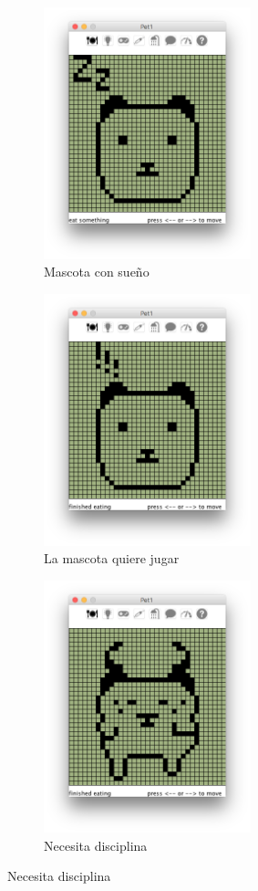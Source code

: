 \documentclass[12pt]{amsart}
\begin{document}
\begin{figure}
	\begin{subfigure}[b]{5cm}
	\centering
	\includegraphics[width=6cm]{images/Sleepy.jpg}
	\caption{Mascota con sue\~no}
	\label{sleepy}
	\end{subfigure}
	\begin{subfigure}[b]{5cm}
	\centering
	\includegraphics[width=6cm]{images/Playful.jpg}
	\caption{La mascota quiere jugar}
	\label{playful}
	\end{subfigure}

	\begin{subfigure}[b]{5cm}
	\centering
	\includegraphics[width=6cm]{images/Talk.jpg}
	\caption{Necesita disciplina}
	\label{talk}
	\end{subfigure}


\end{figure}
\end{document}
